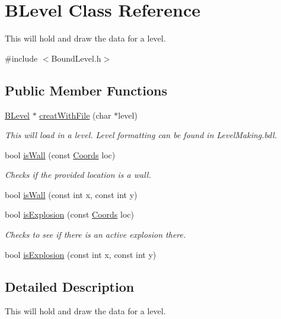 \hypertarget{class_b_level}{\section{\-B\-Level \-Class \-Reference}
\label{class_b_level}
}


\-This will hold and draw the data for a level.  




{\ttfamily \#include $<$\-Bound\-Level.\-h$>$}

\subsection*{\-Public \-Member \-Functions}
\begin{DoxyCompactItemize}
\item 
\hyperlink{class_b_level}{\-B\-Level} $\ast$ \hyperlink{class_b_level_aa15bc1515221e23a3fc8e5063b69a3d2}{creat\-With\-File} (char $\ast$level)
\begin{DoxyCompactList}\small\item\em \-This will load in a level. \-Level formatting can be found in \-Level\-Making.\-bdl. \end{DoxyCompactList}\item 
bool \hyperlink{class_b_level_abb407d85aebcc0d6cded1ad13c2e2eed}{is\-Wall} (const \hyperlink{struct_coords}{\-Coords} loc)
\begin{DoxyCompactList}\small\item\em \-Checks if the provided location is a wall. \end{DoxyCompactList}\item 
bool \hyperlink{class_b_level_a7520cdd30191a75a7811c42ee1758e65}{is\-Wall} (const int x, const int y)
\item 
bool \hyperlink{class_b_level_adf39bb6a72e7780031a0806df92f9fc5}{is\-Explosion} (const \hyperlink{struct_coords}{\-Coords} loc)
\begin{DoxyCompactList}\small\item\em \-Checks to see if there is an active explosion there. \end{DoxyCompactList}\item 
bool \hyperlink{class_b_level_acf89db789ceb7f083221fab3fead042e}{is\-Explosion} (const int x, const int y)
\end{DoxyCompactItemize}


\subsection{\-Detailed \-Description}
\-This will hold and draw the data for a level. 

